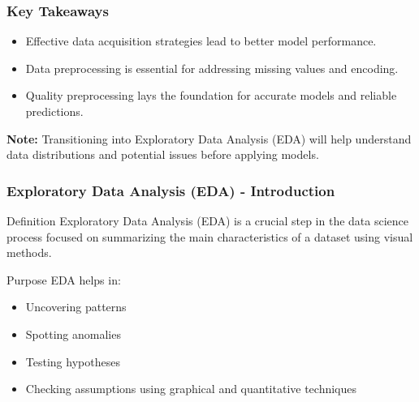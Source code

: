 \documentclass[aspectratio=169]{beamer}
\begin{document}
\begin{frame}[fragile]
    \frametitle{Key Takeaways}
    \begin{itemize}
        \item Effective data acquisition strategies lead to better model performance.
        \item Data preprocessing is essential for addressing missing values and encoding.
        \item Quality preprocessing lays the foundation for accurate models and reliable predictions.
    \end{itemize}
    \textbf{Note:} Transitioning into Exploratory Data Analysis (EDA) will help understand data distributions and potential issues before applying models.
\end{frame}

\begin{frame}[fragile]
    \frametitle{Exploratory Data Analysis (EDA) - Introduction}
    \begin{block}{Definition}
        Exploratory Data Analysis (EDA) is a crucial step in the data science process focused on summarizing the main characteristics of a dataset using visual methods. 
    \end{block}
    
    \begin{block}{Purpose}
        EDA helps in:
        \begin{itemize}
            \item Uncovering patterns
            \item Spotting anomalies
            \item Testing hypotheses
            \item Checking assumptions using graphical and quantitative techniques
        \end{itemize}
    \end{block}
\end{frame}
\end{document}
